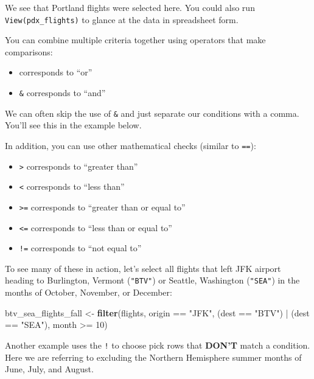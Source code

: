 \documentclass[]{tufte-book}
\newenvironment{Shaded}{\begin{snugshade}}{\end{snugshade}}
\newcommand{\KeywordTok}[1]{\textcolor[rgb]{0.13,0.29,0.53}{\textbf{{#1}}}}
\newcommand{\DecValTok}[1]{\textcolor[rgb]{0.00,0.00,0.81}{{#1}}}
\newcommand{\StringTok}[1]{\textcolor[rgb]{0.31,0.60,0.02}{{#1}}}
\newcommand{\NormalTok}[1]{{#1}}
\providecommand{\tightlist}{%
  \setlength{\itemsep}{0pt}\setlength{\parskip}{0pt}}
\begin{document}
We see that Portland flights were selected here. You could also run
\texttt{View(pdx\_flights)} to glance at the data in spreadsheet form.

You can combine multiple criteria together using operators that make
comparisons:

\begin{itemize}
\tightlist
\item
  \texttt{\textbar{}} corresponds to ``or''
\item
  \texttt{\&} corresponds to ``and''
\end{itemize}

We can often skip the use of \texttt{\&} and just separate our
conditions with a comma. You'll see this in the example below.

In addition, you can use other mathematical checks (similar to
\texttt{==}):

\begin{itemize}
\tightlist
\item
  \texttt{\textgreater{}} corresponds to ``greater than''
\item
  \texttt{\textless{}} corresponds to ``less than''
\item
  \texttt{\textgreater{}=} corresponds to ``greater than or equal to''
\item
  \texttt{\textless{}=} corresponds to ``less than or equal to''
\item
  \texttt{!=} corresponds to ``not equal to''
\end{itemize}

To see many of these in action, let's select all flights that left JFK
airport heading to Burlington, Vermont (\texttt{"BTV"}) or Seattle,
Washington (\texttt{"SEA"}) in the months of October, November, or
December:

\begin{Shaded}
\begin{Highlighting}[]
\NormalTok{btv_sea_flights_fall <-}\StringTok{ }\KeywordTok{filter}\NormalTok{(flights,}
                               \NormalTok{origin ==}\StringTok{ "JFK"}\NormalTok{, }
                               \NormalTok{(dest ==}\StringTok{ "BTV"}\NormalTok{) |}\StringTok{ }\NormalTok{(dest ==}\StringTok{ "SEA"}\NormalTok{),}
                               \NormalTok{month >=}\StringTok{ }\DecValTok{10}\NormalTok{)}
\end{Highlighting}
\end{Shaded}

Another example uses the \texttt{!} to choose pick rows that
\textbf{DON'T} match a condition. Here we are referring to excluding the
Northern Hemisphere summer months of June, July, and August.
\end{document}
